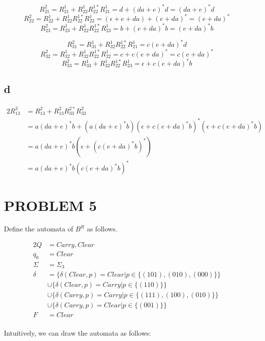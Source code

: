 \documentclass{ctexart}
\begin{document}
\[R_{21}^2 = R_{21}^1 +R_{22}^1R_{22}^{1*}R_{21}^1 = d+(da+e)^*d=(da+e)^*d  \]
\[R_{22}^2 = R_{22}^1 +R_{22}^1R_{22}^{1*}R_{22}^1 = (\epsilon+e+da)+(e+da)^*=(e+da)^*  \]
\[R_{23}^2 = R_{23}^1 +R_{22}^1R_{22}^{1*}R_{23}^1 = b+(e+da)^*b=(e+da)^*b  \]

\[R_{31}^2 = R_{31}^1 +R_{32}^1R_{22}^{1*}R_{21}^1 = c(e+da)^*d  \]
\[R_{32}^2 = R_{32}^1 +R_{32}^1R_{22}^{1*}R_{22}^1 = c+c(e+da)^*=c(e+da)^*  \]
\[R_{33}^2 = R_{33}^1 +R_{32}^1R_{22}^{1*}R_{23}^1 = \epsilon+c(e+da)^*b  \]

\subsection{d}
\begin{alignat*}{2}
	R_{13}^3 & =R_{13}^2+R_{13}^2R_{33}^{2*}R_{33}^2                                \\
	         & =a(da+e)^*b+(a(da+e)^*b)(\epsilon+c(e+da)^*b)^*(\epsilon+c(e+da)^*b) \\
	         & =a(da+e)^*b(\epsilon+(c(e+da)^*b)^*)                                 \\
	         & =a(da+e)^*b(c(e+da)^*b)^*
\end{alignat*}

\section{PROBLEM 5}

Define the automata of $B^R$ as follows.

\begin{alignat*}{2}
	Q      & ={Carry,Clear}                                             \\
	q_0    & =Clear                                                     \\
	\Sigma & = \Sigma_3                                                 \\
	\delta & = \{\delta(Clear,p)=Clear|p\in\{(101),(010),(000)\}\}      \\
	       & \cup \{\delta(Clear,p)=Carry|p\in\{(110)\} \}              \\
	       & \cup \{\delta(Carry,p)=Carry|p\in\{(111),(100),(010) \} \} \\
	       & \cup \{\delta(Carry,p)=Clear|p\in\{(001) \} \}             \\
	F      & =Clear
\end{alignat*}\\

Intuitively, we can draw the automata as follows:\\
\end{document}
